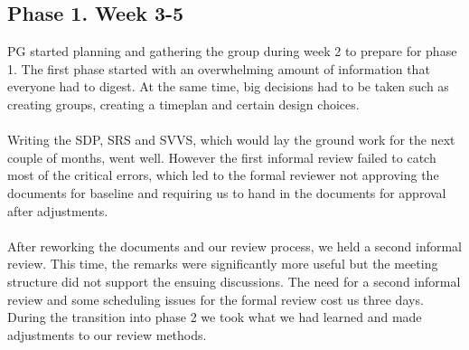 \documentclass{article}
\begin{document}
    \subsection{Phase 1. Week 3-5 \label{phase1}}
        PG started planning and gathering the group during week 2 to prepare for phase 1.
        The first phase started with an overwhelming amount of information that everyone
        had to digest. At the same time, big decisions had to be taken such as creating groups,
        creating a timeplan and certain design choices.
        \\ \\
        Writing the SDP, SRS and SVVS, which would lay the ground work for the next couple of months, went well. However the first informal
        review failed to catch most of the critical errors, which led to the formal reviewer not approving the documents for baseline and
        requiring us to hand in the documents for approval after adjustments.
        \\ \\
        After reworking the documents and our review process, we held a second informal review. This time, the remarks were
        significantly more useful but the meeting structure did not support the ensuing discussions. The need for a second informal review and
        some scheduling issues for the formal review cost us three days. During the transition into phase 2 we took what we had learned and
        made adjustments to our review methods.
\end{document}
